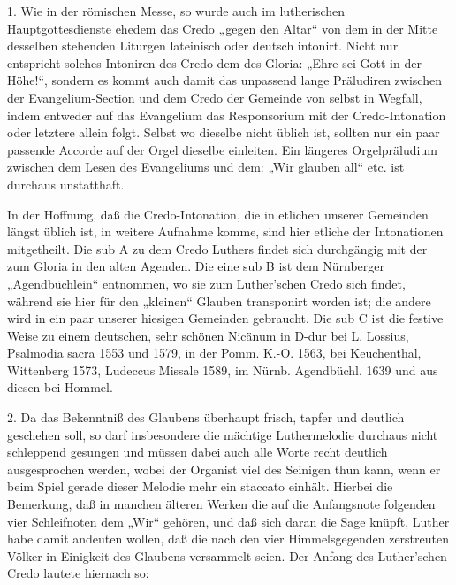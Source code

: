 1. Wie in der römischen Messe, so wurde auch im lutherischen Hauptgottesdienste ehedem das Credo „gegen den Altar“ von dem in der Mitte desselben stehenden Liturgen lateinisch oder deutsch intonirt. Nicht nur entspricht solches Intoniren des Credo dem des Gloria: „Ehre sei Gott in der Höhe!“, sondern es kommt auch damit das unpassend lange Präludiren
zwischen der Evangelium-Section und dem Credo der Gemeinde von selbst in Wegfall, indem entweder auf das Evangelium das Responsorium mit der Credo-Intonation oder letztere allein folgt. Selbst wo dieselbe nicht üblich ist, sollten nur ein paar passende Accorde auf der Orgel dieselbe einleiten. Ein längeres Orgelpräludium zwischen dem Lesen des Evangeliums und dem: „Wir glauben all“ etc. ist durchaus unstatthaft.

In der Hoffnung, daß die Credo-Intonation, die in etlichen unserer Gemeinden längst üblich ist, in weitere Aufnahme komme, sind hier etliche der Intonationen mitgetheilt. Die sub A zu dem Credo Luthers findet sich durchgängig mit der zum Gloria in den alten Agenden. Die eine sub B ist dem Nürnberger „Agendbüchlein“ entnommen, wo sie zum Luther’schen Credo sich findet, während sie hier für den „kleinen“ Glauben transponirt worden ist; die andere wird in ein paar unserer hiesigen Gemeinden gebraucht. Die sub C ist die festive Weise zu einem deutschen, sehr schönen Nicänum in D-dur bei L. Lossius, Psalmodia sacra 1553 und 1579, in der Pomm. K.-O. 1563, bei Keuchenthal, Wittenberg 1573, Ludeccus Missale 1589, im Nürnb. Agendbüchl. 1639 und aus diesen bei Hommel.

2. Da das Bekenntniß des Glaubens überhaupt frisch, tapfer und deutlich geschehen soll, so darf insbesondere die mächtige Luthermelodie durchaus nicht schleppend gesungen und müssen dabei auch alle Worte recht deutlich ausgesprochen werden, wobei der Organist viel des Seinigen thun kann, wenn er beim Spiel gerade dieser Melodie mehr ein staccato einhält. Hierbei die Bemerkung, daß in manchen älteren Werken die auf die Anfangsnote folgenden vier Schleifnoten dem „Wir“ gehören, und daß sich daran die Sage knüpft, Luther habe damit andeuten wollen, daß die nach den vier Himmelsgegenden zerstreuten Völker in Einigkeit des Glaubens versammelt seien. Der Anfang des Luther’schen Credo lautete hiernach so:



